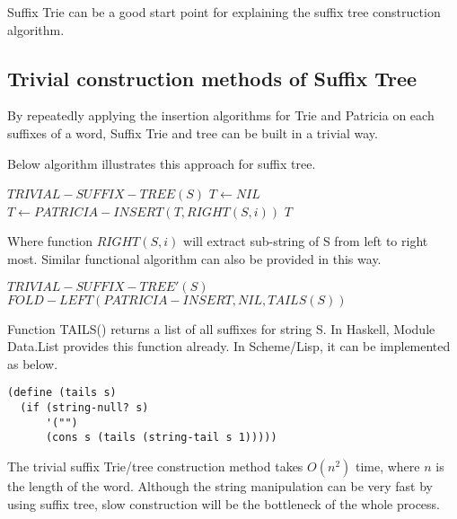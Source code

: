 \documentclass{article}
\begin{document}
Suffix Trie can be a good start point for explaining the suffix tree construction algorithm.

\subsection{Trivial construction methods of Suffix Tree}
\label{trivial-cons}

By repeatedly applying the insertion algorithms\cite{lxy-trie} for Trie and Patricia
on each suffixes of a word, Suffix Trie and tree can be built in a trivial way.

Below algorithm illustrates this approach for suffix tree.

\begin{algorithmic}
\STATE $TRIVIAL-SUFFIX-TREE(S)$
  \STATE $T \leftarrow NIL$
    \STATE $T \leftarrow PATRICIA-INSERT(T, RIGHT(S, i))$
  \ENDFOR
  \RETURN $T$
\end{algorithmic}

Where function $RIGHT(S, i)$ will extract sub-string of S from left to right most.
Similar functional algorithm can also be provided in this way.

\begin{algorithmic}
\STATE $TRIVIAL-SUFFIX-TREE'(S)$
  \RETURN $FOLD-LEFT(PATRICIA-INSERT, NIL, TAILS(S))$
\end{algorithmic}

Function TAILS() returns a list of all suffixes for string S. In Haskell, Module 
Data.List provides this function already. In Scheme/Lisp, it can be implemented as below.

\lstset{language=lisp}
\begin{lstlisting}
(define (tails s)
  (if (string-null? s)
      '("")
      (cons s (tails (string-tail s 1)))))
\end{lstlisting}

The trivial suffix Trie/tree construction method takes $O(n^2)$ time, where $n$ is the 
length of the word. Although the string manipulation can be very fast by using suffix
tree, slow construction will be the bottleneck of the whole process.

\end{document}
